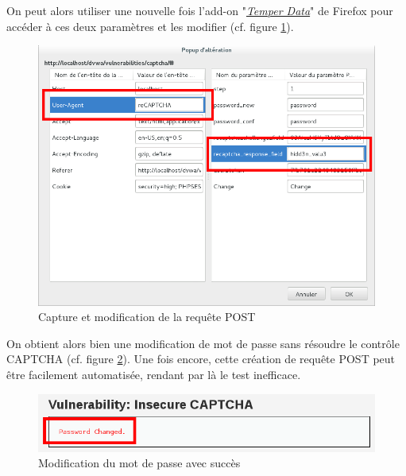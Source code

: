 On peut alors utiliser une nouvelle fois l'add-on "\href{https://addons.mozilla.org/fr/firefox/addon/tamper-data/}{\textit{Temper Data}}" de Firefox pour accéder à ces deux paramètres et les modifier (cf. figure \ref{captcha5}).

\begin{figure}[!h]
\begin{center}

\includegraphics[scale=0.5]{images/captcha5.png}

\caption{Capture et modification de la requête POST}
\label{captcha5}
\end{center}
\end{figure}

On obtient alors bien une modification de mot de passe sans résoudre le contrôle CAPTCHA (cf. figure \ref{captcha6}). Une fois encore, cette création de requête POST peut être facilement automatisée, rendant par là le test inefficace.\\

\begin{figure}[!h]
\begin{center}

\includegraphics[scale=0.5]{images/captcha6.png}

\caption{Modification du mot de passe avec succès}
\label{captcha6}
\end{center}
\end{figure}

